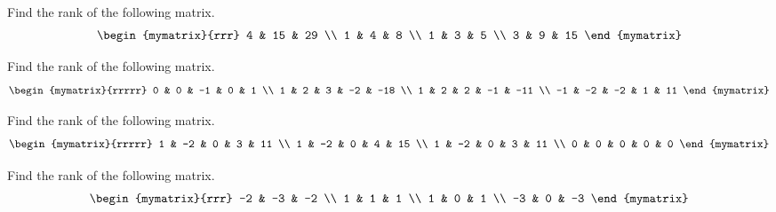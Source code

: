 \begin{enumialphparenastyle}
\begin{ex} Find the rank of the following matrix.
\begin{equation*}
\begin{mymatrix}{rrr}
4 & 15 & 29 \\
1 & 4 & 8 \\
1 & 3 & 5 \\
3 & 9 & 15
\end{mymatrix}
\end{equation*}
\end{ex}

\begin{ex} Find the rank of the following matrix. 
\begin{equation*}
\begin{mymatrix}{rrrrr}
0 & 0 & -1 & 0 & 1 \\
1 & 2 & 3 & -2 & -18 \\
1 & 2 & 2 & -1 & -11 \\
-1 & -2 & -2 & 1 & 11
\end{mymatrix}
\end{equation*}
\end{ex}

\begin{ex} Find the rank of the following matrix.
\begin{equation*}
\begin{mymatrix}{rrrrr}
1 & -2 & 0 & 3 & 11 \\
1 & -2 & 0 & 4 & 15 \\
1 & -2 & 0 & 3 & 11 \\
0 & 0 & 0 & 0 & 0
\end{mymatrix}
\end{equation*}
\end{ex}

\begin{ex} Find the rank of the following matrix.
\begin{equation*}
\begin{mymatrix}{rrr}
-2 & -3 & -2 \\
1 & 1 & 1 \\
1 & 0 & 1 \\
-3 & 0 & -3
\end{mymatrix}
\end{equation*}
\end{ex}


\end{enumialphparenastyle}

